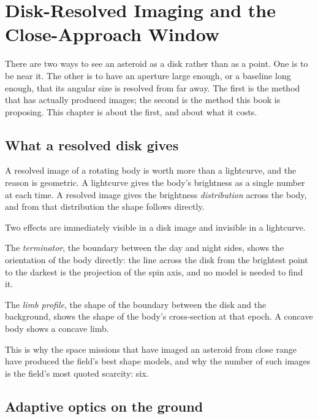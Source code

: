 
\chapter{Disk-Resolved Imaging and the Close-Approach Window}
\label{ch:disk-imaging}

There are two ways to see an asteroid as a disk rather than as a point. One
is to be near it. The other is to have an aperture large enough, or a
baseline long enough, that its angular size is resolved from far away. The
first is the method that has actually produced images; the second is the
method this book is proposing. This chapter is about the first, and about
what it costs.

\section{What a resolved disk gives}

A resolved image of a rotating body is worth more than a lightcurve, and the
reason is geometric. A lightcurve gives the body's brightness as a single
number at each time. A resolved image gives the brightness \emph{distribution}
across the body, and from that distribution the shape follows directly.

Two effects are immediately visible in a disk image and invisible in a
lightcurve.

The \emph{terminator}, the boundary between the day and night sides, shows
the orientation of the body directly: the line across the disk from the
brightest point to the darkest is the projection of the spin axis, and no
model is needed to find it.

The \emph{limb profile}, the shape of the boundary between the disk and the
background, shows the shape of the body's cross-section at that epoch. A
concave body shows a concave limb.

This is why the space missions that have imaged an asteroid from close range
have produced the field's best shape models, and why the number of such
images is the field's most quoted scarcity: six.

\section{Adaptive optics on the ground}

